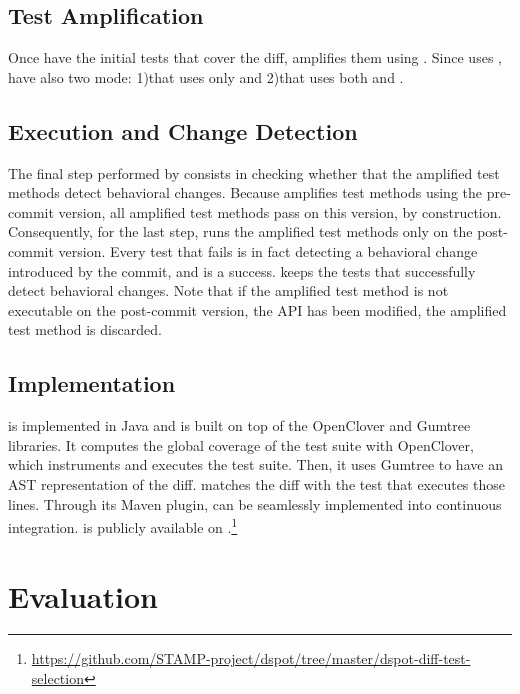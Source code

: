 \subsection{Test Amplification}
\label{sec:dci:techniques:amplification}

Once \DCI have the initial tests that cover the diff, \DCI amplifies them using \dspot.
Since \DCI uses \dspot, \DCI have also two mode:
1)\DCIA that uses only \Aampl and
2)\DCII that uses both \Aampl and \Iampl.

\subsection{Execution and Change Detection}
\label{sec:dci:techniques:execution-change-detection}

The final step performed by \DCI consists in checking whether that the amplified test methods detect behavioral changes.
Because \DCI amplifies test methods using the pre-commit version, all amplified test methods pass on this version, by construction. 
Consequently, for the last step, \DCI runs the amplified test methods only on the post-commit version. 
Every test that fails is in fact detecting a behavioral change introduced by the commit, and is a success.
\DCI keeps the tests that successfully detect behavioral changes.
Note that if the amplified test method is not executable on the post-commit version, \eg the API has been modified, the amplified test method is discarded.

\subsection{Implementation}
\label{sec:dci:techniques:implementation}

\DCI is implemented in Java and is built on top of the OpenClover and Gumtree~\cite{falleri:hal-01054552} libraries.
It computes the global coverage of the test suite with OpenClover, which instruments and executes the test suite.
Then, it uses Gumtree to have an AST representation of the diff.
\DCI matches the diff with the test that executes those lines. 
Through its Maven plugin, \DCI can be seamlessly implemented into continuous integration.
\DCI is publicly available on \gh.\footnote{\url{https://github.com/STAMP-project/dspot/tree/master/dspot-diff-test-selection}}

\section{Evaluation}
\label{sec:dci:evaluation}

